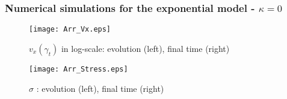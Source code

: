 \documentclass{beamer}
\def\red{\color{red}}
\def\blue{\color{blue}}
\begin{document}
% 
% 
\begin{frame}\frametitle{\small Numerical simulations  for the exponential model - $\kappa = 0$}

\begin{figure}
\centering
\texttt{[image: Arr\_Vx.eps]}
\caption{$v_x(\gamma_{t})$ in log-scale: evolution (left), final time (right)}
\label{arvx}
\end{figure}
%
\vspace{-0.5cm}
%
\begin{figure}
\centering
\texttt{[image: Arr\_Stress.eps]}
\caption{$\sigma$ : evolution (left), final time (right)}
\label{arstress}
\end{figure}
\end{frame}
\end{document}
